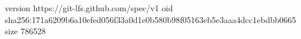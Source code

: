 version https://git-lfs.github.com/spec/v1
oid sha256:171a6209b6a10efed056f33a0d1e0b580b98f05163eb5e3aaa4dcc1ebdbb0665
size 786528
